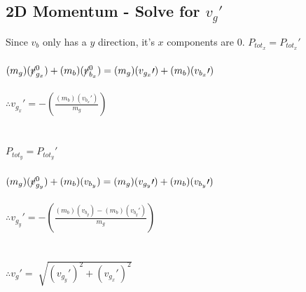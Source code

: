 \documentclass{article}
\begin{document}
\begin{adjustwidth}{1cm}{0pt}
    \subsection*{2D Momentum - Solve for $v_{g}\prime$}
    \begin{adjustwidth}{1cm}{0pt}
        Since $v_{b}$ only has a $y$ direction, it's $x$ components are 0.\newline\newline
        $P_{tot_{x}} = P_{tot_{x}}\prime$ \\\\
        $(m_{g})(\cancel{v}_{g_{x}}^0) + (m_{b})(\cancel{v}_{b_{x}}^0) = (m_{g})(v_{g_{x}}\prime) + (m_{b})(v_{b_{x}}\prime)$ \\\\
        $\therefore v_{g_{x}}\prime = -\left(\frac{(m_{b})(v_{b_{x}}\prime)}{m_{g}}\right)$
        \\\\\\
        $P_{tot_{y}} = P_{tot_{y}}\prime$ \\\\
        $(m_{g})(\cancel{v}_{g_{y}}^0) + (m_{b})(v_{b_{y}}) = (m_{g})(v_{g_{y}}\prime) + (m_{b})(v_{b_{y}}\prime)$ \\\\
        $\therefore v_{g_{y}}\prime = -\left(\frac{(m_{b})(v_{b_{y}}) - (m_{b})(v_{b_{y}}\prime)}{m_{g}}\right)$
        \\\\\\
        $\therefore v_{g}\prime = \sqrt[]{{(v_{g_{y}}\prime)}^2 + {(v_{g_{x}}\prime)}^2}$ \\\\
    \end{adjustwidth}
\end{adjustwidth}


\end{document}
